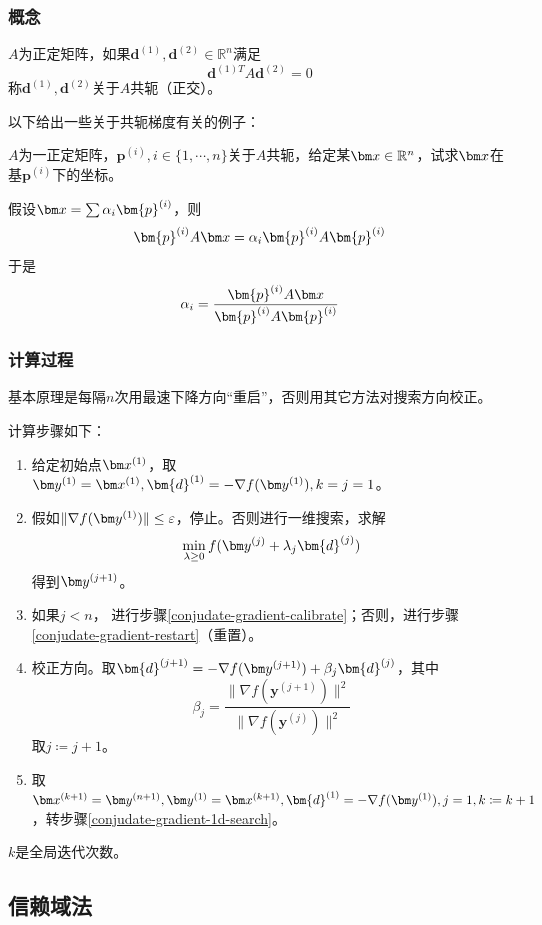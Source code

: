\subsubsection{概念}
\begin{definition}[共轭梯度]\label{conjugate-gradient}
$A$为正定矩阵，如果$\bm{d}^{(1)},\bm{d}^{(2)}\in\mathbb{R}^n$满足
$$\bm{d}^{(1)T}A\bm{d}^{(2)}=0$$
称$\bm{d}^{(1)},\bm{d}^{(2)}$关于$A$共轭（正交）。
\end{definition}
以下给出一些关于共轭梯度有关的例子：
\begin{example}
$A$为一正定矩阵，$\bm{p}^{(i)},i\in\{1,\cdots,n\}$关于$A$共轭，给定某$\bx\in\mathbb{R}^n$，试求$\bx$在基$\bm{p}^{(i)}$下的坐标。
\end{example}
\begin{solution}
假设$\bx=\sum \alpha_i \bm{p}^{(i)}$，则
$$\bm{p}^{(i)}A\bx=\alpha_i\bm{p}^{(i)}A\bm{p}^{(i)}$$
于是
$$\alpha_i=\frac{\bm{p}^{(i)}A\bx}{\bm{p}^{(i)}A\bm{p}^{(i)}}$$
\end{solution}
\subsubsection{计算过程}
基本原理是每隔$n$次用最速下降方向“重启”，否则用其它方法对搜索方向校正。

计算步骤如下：
\begin{enumerate}
\item 给定初始点$\bx^{(1)}$，取$\by^{(1)}=\bx^{(1)},\bm{d}^{(1)}=-\nabla f(\by^{(1)}),k=j=1$。
\item\label{conjudate-gradient-1d-search} 假如$\|\nabla f(\by^{(1)})\|\leq \varepsilon$，停止。否则进行一维搜索，求解
$$\min_{\lambda \geq 0}f(\by^{(j)}+\lambda_j \bm{d}^{(j)})$$
得到$\by^{(j+1)}$。
\item 如果$j<n$， 进行步骤\ref{conjudate-gradient-calibrate}；否则，进行步骤\ref{conjudate-gradient-restart}（重置）。
\item\label{conjudate-gradient-calibrate}  校正方向。取$\bm{d}^{(j+1)}=-\nabla f(\by^{(j+1)})+\beta_j \bm{d}^{(j)}$，其中
$$\beta_j=\frac{\|\nabla f(\bm{y}^{(j+1)})\|^2}{\|\nabla f(\bm{y}^{(j)})\|^2}$$
取$j\coloneqq j+1$。
\item\label{conjudate-gradient-restart}取$\bx^{(k+1)}=\by^{(n+1)},\by^{(1)}=\bx^{(k+1)},\bm{d}^{(1)}=-\nabla f(\by^{(1)}),j=1,k\coloneqq k+1$，转步骤\ref{conjudate-gradient-1d-search}。
\end{enumerate}
$k$是全局迭代次数。
\subsection{信赖域法}

